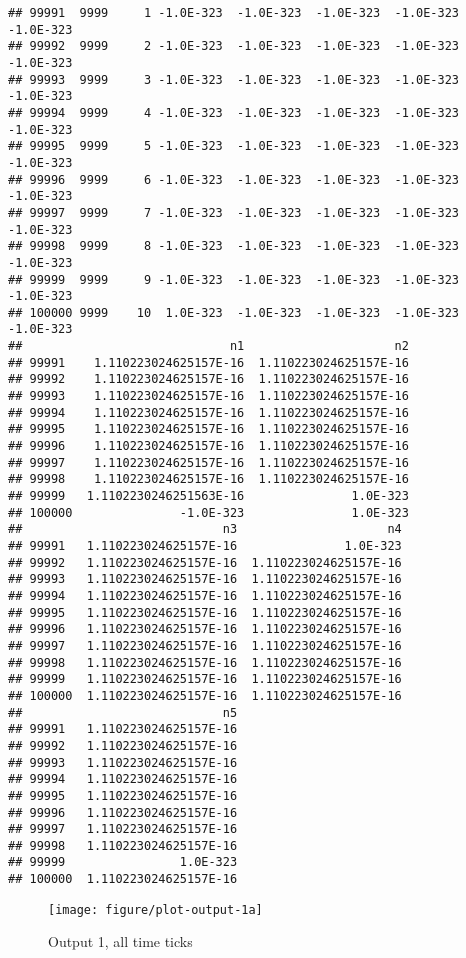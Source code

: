 \documentclass{article}\usepackage[]{graphicx}\usepackage[]{color}
\makeatletter
\def\maxwidth{ %
  \ifdim\Gin@nat@width>\linewidth
    \linewidth
  \else
    \Gin@nat@width
  \fi
}
\newenvironment{kframe}{%
 \def\at@end@of@kframe{}%
 \ifinner\ifhmode%
  \def\at@end@of@kframe{\end{minipage}}%
  \begin{minipage}{\columnwidth}%
 \fi\fi%
 \def\FrameCommand##1{\hskip\@totalleftmargin \hskip-\fboxsep
 \colorbox{shadecolor}{##1}\hskip-\fboxsep
     \hskip-\linewidth \hskip-\@totalleftmargin \hskip\columnwidth}%
 \MakeFramed {\advance\hsize-\width
   \@totalleftmargin\z@ \linewidth\hsize
   \@setminipage}}%
 {\par\unskip\endMakeFramed%
 \at@end@of@kframe}
\newenvironment{knitrout}{}{} %
\makeatother
\begin{document}
\begin{knitrout}
\begin{kframe}
\begin{verbatim}
## 99991  9999     1 -1.0E-323  -1.0E-323  -1.0E-323  -1.0E-323  -1.0E-323
## 99992  9999     2 -1.0E-323  -1.0E-323  -1.0E-323  -1.0E-323  -1.0E-323
## 99993  9999     3 -1.0E-323  -1.0E-323  -1.0E-323  -1.0E-323  -1.0E-323
## 99994  9999     4 -1.0E-323  -1.0E-323  -1.0E-323  -1.0E-323  -1.0E-323
## 99995  9999     5 -1.0E-323  -1.0E-323  -1.0E-323  -1.0E-323  -1.0E-323
## 99996  9999     6 -1.0E-323  -1.0E-323  -1.0E-323  -1.0E-323  -1.0E-323
## 99997  9999     7 -1.0E-323  -1.0E-323  -1.0E-323  -1.0E-323  -1.0E-323
## 99998  9999     8 -1.0E-323  -1.0E-323  -1.0E-323  -1.0E-323  -1.0E-323
## 99999  9999     9 -1.0E-323  -1.0E-323  -1.0E-323  -1.0E-323  -1.0E-323
## 100000 9999    10  1.0E-323  -1.0E-323  -1.0E-323  -1.0E-323  -1.0E-323
##                             n1                     n2
## 99991    1.110223024625157E-16  1.110223024625157E-16
## 99992    1.110223024625157E-16  1.110223024625157E-16
## 99993    1.110223024625157E-16  1.110223024625157E-16
## 99994    1.110223024625157E-16  1.110223024625157E-16
## 99995    1.110223024625157E-16  1.110223024625157E-16
## 99996    1.110223024625157E-16  1.110223024625157E-16
## 99997    1.110223024625157E-16  1.110223024625157E-16
## 99998    1.110223024625157E-16  1.110223024625157E-16
## 99999   1.1102230246251563E-16               1.0E-323
## 100000               -1.0E-323               1.0E-323
##                            n3                     n4
## 99991   1.110223024625157E-16               1.0E-323
## 99992   1.110223024625157E-16  1.110223024625157E-16
## 99993   1.110223024625157E-16  1.110223024625157E-16
## 99994   1.110223024625157E-16  1.110223024625157E-16
## 99995   1.110223024625157E-16  1.110223024625157E-16
## 99996   1.110223024625157E-16  1.110223024625157E-16
## 99997   1.110223024625157E-16  1.110223024625157E-16
## 99998   1.110223024625157E-16  1.110223024625157E-16
## 99999   1.110223024625157E-16  1.110223024625157E-16
## 100000  1.110223024625157E-16  1.110223024625157E-16
##                            n5
## 99991   1.110223024625157E-16
## 99992   1.110223024625157E-16
## 99993   1.110223024625157E-16
## 99994   1.110223024625157E-16
## 99995   1.110223024625157E-16
## 99996   1.110223024625157E-16
## 99997   1.110223024625157E-16
## 99998   1.110223024625157E-16
## 99999                1.0E-323
## 100000  1.110223024625157E-16
\end{verbatim}
\end{kframe}\begin{figure}[]

\texttt{[image: figure/plot-output-1a]} \caption[Output 1, all time ticks]{Output 1, all time ticks\label{fig:plot-output-1a}}
\end{figure}


\end{knitrout}
\end{document}
